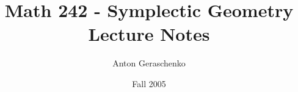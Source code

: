 \documentclass[11pt]{amsart}
\theoremstyle{plain}
\theoremstyle{definition}
\theoremstyle{remark}
\begin{document}
 \title{Math 242 - Symplectic Geometry \\ Lecture Notes}
 \author{Anton Geraschenko}
 \date{Fall 2005}
 \maketitle
 \thispagestyle{empty}

 {}
 {}
 {}
 {}
 {}
 {}
 {}
 {}
 {}
 {}
 {}
 {}
 {}
 {}
 {}
 {}
 {}
 {}
 {}
 {}
 {}
 {}
 {}
 {}
 {}
 {}
 {}
\end{document}
